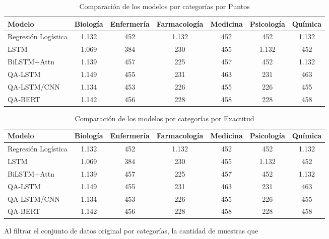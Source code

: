 \begin{table}[!tb]
  \begin{center}
    \caption{Comparación de los modelos por categorías por Puntos}
    \begin{tabular}{l|c|c|c|c|c|c}
      \textbf{Modelo} & \textbf{Biología} & \textbf{Enfermería} & \textbf{Farmacología} & \textbf{Medicina} & \textbf{Psicología} & \textbf{Química}\\
      \hline
      Regresión Logística & 1.132 & 452 & 1.132 & 452 & 452 & 1.132\\
      LSTM & 1.069 & 384 & 230 & 455 & 1.132 & 452 \\
      BiLSTM+Attn & 1.139 & 457 & 225 & 457 & 452 & 1.132 \\
      QA-LSTM & 1.149 & 455 & 231 & 463 & 231 & 463 \\
      QA-LSTM/CNN & 1.134 & 453 & 226 & 455 & 226 & 455 \\
      QA-BERT & 1.142 & 456 & 228 & 458 & 228 & 458 
    \end{tabular}
  \end{center}
  \label{comparison_points}
\end{table}


\begin{table}[!tb]
  \begin{center}
    \caption{Comparación de los modelos por categorías por Exactitud}
    \begin{tabular}{l|c|c|c|c|c|c}
      \textbf{Modelo} & \textbf{Biología} & \textbf{Enfermería} & \textbf{Farmacología} & \textbf{Medicina} & \textbf{Psicología} & \textbf{Química}\\
      \hline
      Regresión Logística & 1.132 & 452 & 1.132 & 452 & 452 & 1.132\\
      LSTM & 1.069 & 384 & 230 & 455 & 1.132 & 452 \\
      BiLSTM+Attn & 1.139 & 457 & 225 & 457 & 452 & 1.132 \\
      QA-LSTM & 1.149 & 455 & 231 & 463 & 231 & 463 \\
      QA-LSTM/CNN & 1.134 & 453 & 226 & 455 & 226 & 455 \\
      QA-BERT & 1.142 & 456 & 228 & 458 & 228 & 458 \\ 
    \end{tabular}
  \end{center}
  \label{comparison_accuracy}
\end{table}


Al filtrar el conjunto de datos original por categorías, la cantidad de muestras que 



